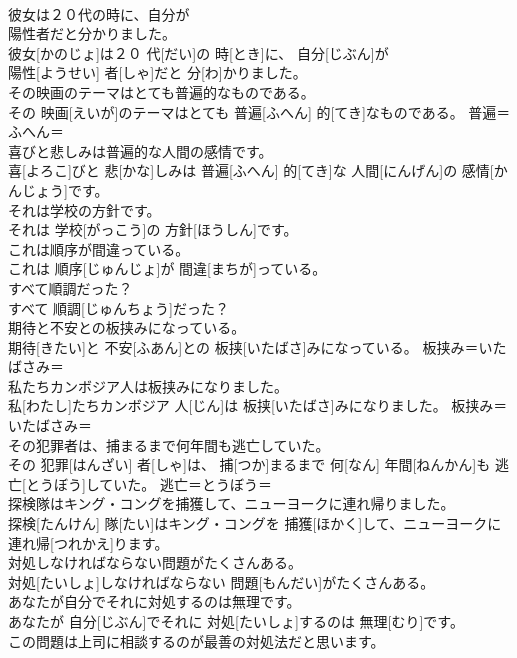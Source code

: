 \documentclass[8pt]{extreport}
\begin{document}
\begin{CJK}{UTF8}{min}
\\	彼女は２０代の時に、自分が 
\\	陽性者だと分かりました。	
\\	彼女[かのじょ]は２０ 代[だい]の 時[とき]に、 自分[じぶん]が 
\\	陽性[ようせい] 者[しゃ]だと 分[わ]かりました。	
\\	その映画のテーマはとても普遍的なものである。	
\\	その 映画[えいが]のテーマはとても 普遍[ふへん] 的[てき]なものである。	普遍＝ふへん＝ 
\\	喜びと悲しみは普遍的な人間の感情です。	
\\	喜[よろこ]びと 悲[かな]しみは 普遍[ふへん] 的[てき]な 人間[にんげん]の 感情[かんじょう]です。	
\\	それは学校の方針です。	
\\	それは 学校[がっこう]の 方針[ほうしん]です。	
\\	これは順序が間違っている。	
\\	これは 順序[じゅんじょ]が 間違[まちが]っている。	
\\	すべて順調だった？	
\\	すべて 順調[じゅんちょう]だった？	
\\	期待と不安との板挟みになっている。	
\\	期待[きたい]と 不安[ふあん]との 板挟[いたばさ]みになっている。	板挟み＝いたばさみ＝ 
\\	私たちカンボジア人は板挟みになりました。	
\\	私[わたし]たちカンボジア 人[じん]は 板挟[いたばさ]みになりました。	板挟み＝いたばさみ＝ 
\\	その犯罪者は、捕まるまで何年間も逃亡していた。	
\\	その 犯罪[はんざい] 者[しゃ]は、 捕[つか]まるまで 何[なん] 年間[ねんかん]も 逃亡[とうぼう]していた。	逃亡＝とうぼう＝ 
\\	探検隊はキング・コングを捕獲して、ニューヨークに連れ帰りました。	
\\	探検[たんけん] 隊[たい]はキング・コングを 捕獲[ほかく]して、ニューヨークに 連れ帰[つれかえ]ります。	
\\	対処しなければならない問題がたくさんある。	
\\	対処[たいしょ]しなければならない 問題[もんだい]がたくさんある。	
\\	あなたが自分でそれに対処するのは無理です。	
\\	あなたが 自分[じぶん]でそれに 対処[たいしょ]するのは 無理[むり]です。	
\\	この問題は上司に相談するのが最善の対処法だと思います。	

\end{CJK}
\end{document}
